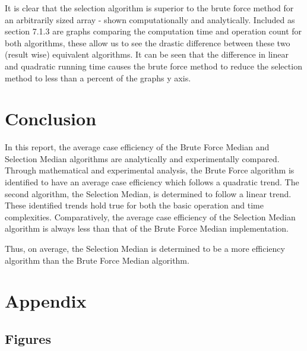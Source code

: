 \documentclass{article}
\begin{document}
        It is clear that the selection algorithm is superior to the brute force method for an arbitrarily sized array - shown computationally and analytically. Included as section 7.1.3 are graphs comparing the computation time and operation count for both algorithms, these allow us to see the drastic difference between these two (result wise) equivalent algorithms. It can be seen that the difference in linear and quadratic running time causes the brute force method to reduce the selection method to less than a percent of the graphs y axis.
\section{Conclusion}
    In this report, the average case efficiency of the Brute Force Median and Selection Median algorithms are analytically and experimentally compared. Through mathematical and experimental analysis, the Brute Force algorithm is identified to have an average case efficiency which follows a quadratic trend. The second algorithm, the Selection Median, is determined to follow a linear trend. These identified trends hold true for both the basic operation and time complexities. Comparatively, the average case efficiency of the Selection Median algorithm is always less than that of the Brute Force Median implementation. 

    Thus, on average, the Selection Median is determined to be a more efficiency algorithm than the Brute Force Median algorithm.
\newpage
\section{Appendix}
    \subsection{Figures}
\end{document}

